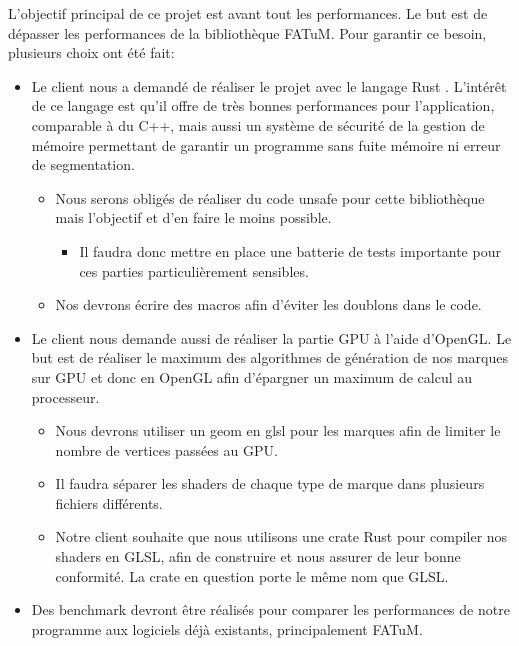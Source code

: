 \documentclass[12pt]{article}
\begin{document}
L'objectif principal de ce projet est avant tout les performances. Le but est de dépasser les performances de la bibliothèque FATuM. Pour garantir
ce besoin, plusieurs choix ont été fait:
	\begin{itemize}
		\item Le client nous a demandé de réaliser le projet avec le langage Rust \cite{rust}. L'intérêt de ce langage est qu'il offre de très bonnes
		performances pour l'application, comparable à du C++, mais aussi un système de sécurité de la gestion de mémoire permettant de garantir un programme
		sans fuite mémoire ni erreur de segmentation.
		\begin{itemize}
			\item Nous serons obligés de réaliser du code \gls{unsafe} pour cette bibliothèque mais l'objectif et d'en faire le moins possible.
			\begin{itemize}
				\item Il faudra donc mettre en place une batterie de tests importante pour ces parties particulièrement sensibles.
			\end{itemize}
			\item Nos devrons écrire des macros afin d'éviter les doublons dans le code.
		\end{itemize}
		\item Le client nous demande aussi de réaliser la partie GPU à l'aide d'OpenGL. Le but est de réaliser le maximum des algorithmes de génération de nos marques sur GPU et donc en OpenGL afin d'épargner un maximum de calcul au processeur.
		\begin{itemize}
			\item Nous devrons utiliser un \gls{geom} en glsl pour les marques afin de limiter le nombre de vertices passées au GPU.
			\item Il faudra séparer les \gls{shader}s de chaque type de marque dans plusieurs fichiers différents.
			\item Notre client souhaite que nous utilisons une crate Rust pour compiler
			nos shaders en GLSL, afin de construire et nous assurer de leur bonne conformité.
			La crate en question porte le même nom que GLSL\cite{GLSL}.
		\end{itemize}
		\item Des benchmark devront être réalisés pour comparer les performances de notre programme aux logiciels déjà existants, principalement FATuM.

	\end{itemize}
\end{document}
